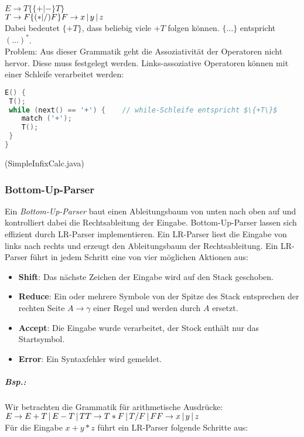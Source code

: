 $E\to T \{ \{+|-\} T \}$\\
$T \to F \{ (*|/)F\}\\
F \to x\,|\,y\,|\,z$\\
Dabei bedeutet $\{ +T \}$, dass beliebig viele $+T$ folgen können. $\{...\}$ entspricht $(...)^*$.\\
Problem: Aus dieser Grammatik geht die Assoziativität der Operatoren nicht hervor. Diese muss festgelegt werden. Links-assoziative Operatoren können mit einer Schleife verarbeitet werden:
\begin{lstlisting}[language=C]
E() {
 T();
 while (next() == '+') {	// while-Schleife entspricht $\{+T\}$
 	match ('+');
 	T();
 }
}
\end{lstlisting}
(SimpleInfixCalc.java)


\subsubsection{Bottom-Up-Parser}
Ein \emph{Bottom-Up-Parser} baut einen Ableitungsbaum von unten nach oben auf und kontrolliert dabei die Rechtsableitung der Eingabe. Bottom-Up-Parser lassen sich effizient durch LR-Parser implementieren. Ein LR-Parser liest die Eingabe von links nach rechts und erzeugt den Ableitungsbaum der Rechtsableitung. Ein LR-Parser führt in jedem Schritt eine von vier möglichen Aktionen aus:
\begin{itemize}
\item \textbf{Shift}: Das nächste Zeichen der Eingabe wird auf den Stack geschoben.
\item \textbf{Reduce}: Ein oder mehrere Symbole von der Spitze des Stack entsprechen der rechten Seite $A \to \gamma$ einer Regel und werden durch $A$ ersetzt.
\item \textbf{Accept}: Die Eingabe wurde verarbeitet, der Stock enthält nur das Startsymbol.
\item \textbf{Error}: Ein Syntaxfehler wird gemeldet.
\end{itemize}
\subparagraph{Bsp.:} Wir betrachten die Grammatik für arithmetische Ausdrücke:\\
$E \to E + T \,|\, E-T \,|\, T\\
T \to T*F \,|\, T/F \,|\, F\\
F \to x \,|\, y \,|\, z$\\
Für die Eingabe $x+y*z$ führt ein LR-Parser folgende Schritte aus:\\
